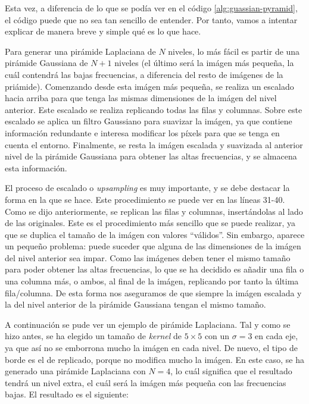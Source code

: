 \documentclass[11pt,a4paper]{article}
\begin{document}
Esta vez, a diferencia de lo que se podía ver en el código \ref{alg:guassian-pyramid}, el código puede que no
sea tan sencillo de entender. Por tanto, vamos a intentar explicar de manera breve y simple qué es lo que hace.

Para generar una pirámide Laplaciana de $N$ niveles, lo más fácil es partir de una pirámide Gaussiana de $N + 1$ niveles
(el último será la imágen más pequeña, la cuál contendrá las bajas frecuencias, a diferencia del resto de imágenes
de la priámide). Comenzando desde esta imágen más pequeña, se realiza un escalado hacia arriba para que tenga las mismas
dimensiones de la imágen del nivel anterior. Este escalado se realiza replicando todas las filas y columnas. Sobre este
escalado se aplica un filtro Gaussiano para suavizar la imágen, ya que contiene información redundante e interesa
modificar los píxels para que se tenga en cuenta el entorno. Finalmente, se resta la imágen escalada y suavizada
al anterior nivel de la pirámide Gaussiana para obtener las altas frecuencias, y se almacena esta información.

El proceso de escalado o \textit{upsampling} es muy importante, y se debe destacar la forma en la que se hace. Este
procedimiento se puede ver en las líneas 31-40. Como se dijo anteriormente, se replican las filas y columnas, insertándolas
al lado de las originales. Este es el procedimiento más sencillo que se puede realizar, ya que se duplica el tamaño de la
imágen con valores ``válidos''. Sin embargo, aparece un pequeño problema: puede suceder que alguna de las dimensiones
de la imágen del nivel anterior sea impar. Como las imágenes deben tener el mismo tamaño para poder obtener las altas
frecuencias, lo que se ha decidido es añadir una fila o una columna más, o ambos, al final de la imágen, replicando por
tanto la última fila/columna. De esta forma nos aseguramos de que siempre la imágen escalada y la del nivel anterior
de la pirámide Gaussiana tengan el mismo tamaño.

A continuación se pude ver un ejemplo de pirámide Laplaciana. Tal y como se hizo antes, se ha elegido un tamaño de
\textit{kernel} de $5 \times 5$ con un $\sigma = 3$ en cada eje, ya que así no se emborrona mucho la imágen en cada nivel.
De nuevo, el tipo de borde es el de replicado, porque no modifica mucho la imágen. En este caso, se ha generado
una pirámide Laplaciana con $N=4$, lo cuál significa que el resultado tendrá un nivel extra, el cuál será la imágen más pequeña
con las frecuencias bajas. El resultado es el siguiente:
\end{document}
